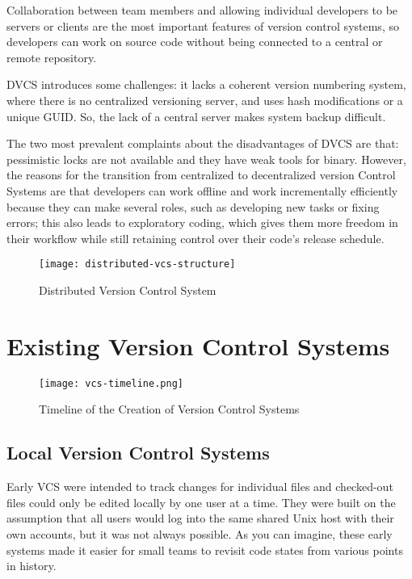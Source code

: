 Collaboration between team members and allowing individual developers to be servers or clients are the most important features of version control systems, so developers can work on source code without being connected to a central or remote repository.

DVCS introduces some challenges: it lacks a coherent version numbering system, where there is no centralized versioning server, and uses hash modifications or a unique GUID. So, the lack of a central server makes system backup difficult.

The two most prevalent complaints about the disadvantages of DVCS are that: pessimistic locks are not available and they have weak tools for binary. However, the reasons for the transition from centralized to decentralized version Control Systems are that developers can work offline and work incrementally efficiently because they can make several roles, such as developing new tasks or fixing errors; this also leads to exploratory coding, which gives them more freedom in their workflow while still retaining control over their code's release schedule.

\begin{figure}[htbp]
    \centering
    \texttt{[image: distributed-vcs-structure]}
    \caption{Distributed Version Control System}
    \label{fig:dvcs-structure}
\end{figure}


\section{Existing Version Control Systems}
\begin{figure}[htbp]
    \centering
    \texttt{[image: vcs-timeline.png]}
    \caption{Timeline of the Creation of Version Control Systems \cite{stopak_2019}}
    \label{fig:vcs-timeline}
\end{figure}
\subsection{Local Version Control Systems}
Early VCS were intended to track changes for individual files and checked-out files could only be edited locally by one user at a time. They were built on the assumption that all users would log into the same shared Unix host with their own accounts, but it was not always possible. As you can imagine, these early systems made it easier for small teams to revisit code states from various points in history.
